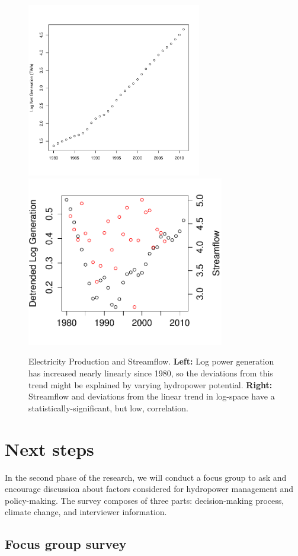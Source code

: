 \documentclass[11pt,english]{article}
\theoremstyle{plain} \newtheorem{claim}{Claim}
\theoremstyle{plain} \newtheorem{prop}{Proposition}
\theoremstyle{plain} \newtheorem{hypo}{Hypothesis}
\begin{document}
\begin{figure}
\includegraphics[width=3in]{displays/loggen.pdf}
\includegraphics[width=3.4in]{displays/correlation.pdf}
\label{fig:loggen}
\caption{Electricity Production and Streamflow.  {\bf Left:} Log power generation has increased nearly linearly since 1980, so the deviations from this trend might be explained by varying hydropower potential. {\bf Right:} Streamflow and deviations from the linear trend in log-space have a statistically-significant, but low, correlation.}
\end{figure}

\section{Next steps}

In the second phase of the research, we will conduct a focus group to ask and encourage discussion about factors considered for hydropower management and policy-making. The survey composes of three parts: decision-making process, climate change, and interviewer information. 

\subsection{Focus group survey}
\end{document}
